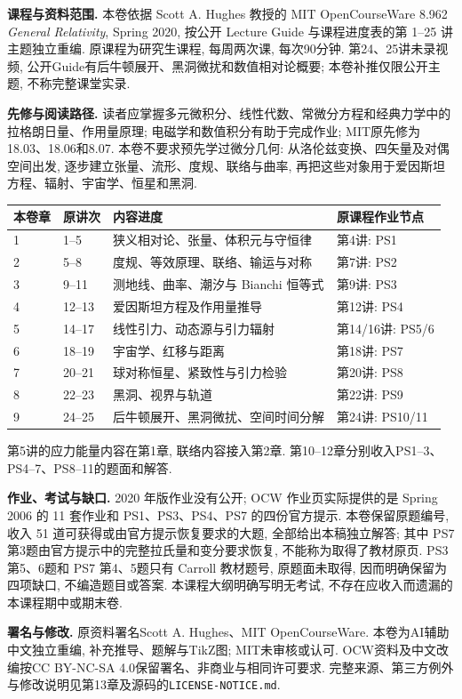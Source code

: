 \noindent\textbf{课程与资料范围.}
本卷依据 Scott A. Hughes 教授的 MIT OpenCourseWare 8.962 \emph{General Relativity}, Spring 2020,
按公开 Lecture Guide 与课程进度表的第 1--25 讲主题独立重编.
原课程为研究生课程, 每周两次课, 每次90分钟.
第24、25讲未录视频, 公开Guide有后牛顿展开、黑洞微扰和数值相对论概要;
本卷补推仅限公开主题, 不称完整课堂实录.

\noindent\textbf{先修与阅读路径.}
读者应掌握多元微积分、线性代数、常微分方程和经典力学中的拉格朗日量、作用量原理;
电磁学和数值积分有助于完成作业; MIT原先修为18.03、18.06和8.07.
本卷不要求预先学过微分几何: 从洛伦兹变换、四矢量及对偶空间出发, 逐步建立张量、流形、度规、联络与曲率,
再把这些对象用于爱因斯坦方程、辐射、宇宙学、恒星和黑洞.

\begin{center}
\small
\begin{tabular}{@{}p{}p{}p{}p{}@{}}
\toprule
本卷章 & 原讲次 & 内容进度 & 原课程作业节点\\
\midrule
1 & 1--5 & 狭义相对论、张量、体积元与守恒律 & 第4讲: PS1\\
2 & 5--8 & 度规、等效原理、联络、输运与对称 & 第7讲: PS2\\
3 & 9--11 & 测地线、曲率、潮汐与 Bianchi 恒等式 & 第9讲: PS3\\
4 & 12--13 & 爱因斯坦方程及作用量推导 & 第12讲: PS4\\
5 & 14--17 & 线性引力、动态源与引力辐射 & 第14/16讲: PS5/6\\
6 & 18--19 & 宇宙学、红移与距离 & 第18讲: PS7\\
7 & 20--21 & 球对称恒星、紧致性与引力检验 & 第20讲: PS8\\
8 & 22--23 & 黑洞、视界与轨道 & 第22讲: PS9\\
9 & 24--25 & 后牛顿展开、黑洞微扰、空间时间分解 & 第24讲: PS10/11\\
\bottomrule
\end{tabular}
\end{center}
第5讲的应力能量内容在第1章, 联络内容接入第2章.
第10--12章分别收入PS1--3、PS4--7、PS8--11的题面和解答.

\noindent\textbf{作业、考试与缺口.}
2020 年版作业没有公开; OCW 作业页实际提供的是 Spring 2006 的 11 套作业和 PS1、PS3、PS4、PS7 的四份官方提示.
本卷保留原题编号, 收入 51 道可获得或由官方提示恢复要求的大题, 全部给出本稿独立解答;
其中 PS7 第3题由官方提示中的完整拉氏量和变分要求恢复, 不能称为取得了教材原页.
PS3 第5、6题和 PS7 第4、5题只有 Carroll 教材题号, 原题面未取得, 因而明确保留为四项缺口, 不编造题目或答案.
本课程大纲明确写明无考试, 不存在应收入而遗漏的本课程期中或期末卷.

\noindent\textbf{署名与修改.}
原资料署名Scott A. Hughes、MIT OpenCourseWare.
本卷为AI辅助中文独立重编, 补充推导、题解与TikZ图; MIT未审核或认可.
OCW资料及中文改编按CC BY-NC-SA 4.0保留署名、非商业与相同许可要求.
完整来源、第三方例外与修改说明见第13章及源码的\texttt{LICENSE-NOTICE.md}.
